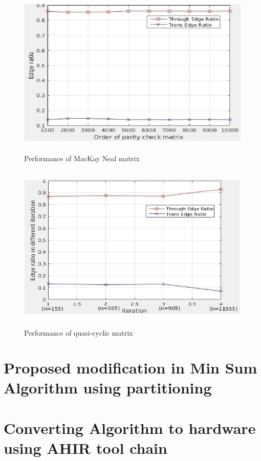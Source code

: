 \documentclass[twopage,12pt,a4paper]{report}
\begin{document}
\begin{raggedright}
  \begin{figure}[h]
 \begin{center}
    \includegraphics[height=8cm,width=12cm]{makey_part.jpg}
    \caption{Performance of MacKay Neal matrix} 
 \end{center}
\end{figure}


 \begin{figure}[h]
 \begin{center}
    \includegraphics[height=8cm,width=12cm]{qc_part.jpg}
    \caption{Performance of quasi-cyclic matrix} 
 \end{center}
\end{figure}


\chapter{Proposed modification in Min Sum Algorithm using partitioning}



\chapter{Converting Algorithm to hardware using AHIR tool chain}


\end{raggedright}
\end{document}
